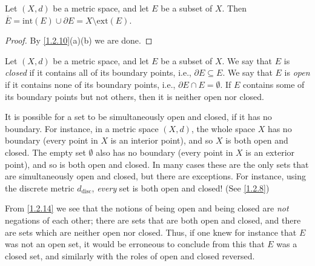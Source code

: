 \begin{cor}\label{1.2.11}
  Let \((X, d)\) be a metric space, and let \(E\) be a subset of \(X\).
  Then \(\overline{E} = \text{int}(E) \cup \partial E = X \setminus \text{ext}(E)\).
\end{cor}

\begin{proof}
  By \cref{1.2.10}(a)(b) we are done.
\end{proof}

\begin{defn}\label{1.2.12}
  Let \((X, d)\) be a metric space, and let \(E\) be a subset of \(X\).
  We say that \(E\) is \emph{closed} if it contains all of its boundary points, i.e., \(\partial E \subseteq E\).
  We say that \(E\) is \emph{open} if it contains none of its boundary points, i.e., \(\partial E \cap E = \emptyset\).
  If \(E\) contains some of its boundary points but not others, then it is neither open nor closed.
\end{defn}

\setcounter{thm}{13}
\begin{rmk}\label{1.2.14}
  It is possible for a set to be simultaneously open and closed, if it has no boundary.
  For instance, in a metric space \((X, d)\), the whole space \(X\) has no boundary (every point in \(X\) is an interior point), and so \(X\) is both open and closed.
  The empty set \(\emptyset\) also has no boundary (every point in \(X\) is an exterior point), and so is both open and closed.
  In many cases these are the only sets that are simultaneously open and closed, but there are exceptions.
  For instance, using the discrete metric \(d_{\text{disc}}\), \emph{every} set is both open and closed! (See \cref{1.2.8})
\end{rmk}

\begin{note}
  From \cref{1.2.14} we see that the notions of being open and being closed are \emph{not} negations of each other;
  there are sets that are both open and closed, and there are sets which are neither open nor closed.
  Thus, if one knew for instance that \(E\) was not an open set, it would be erroneous to conclude from this that \(E\) was a closed set, and similarly with the roles of open and closed reversed.
\end{note}

